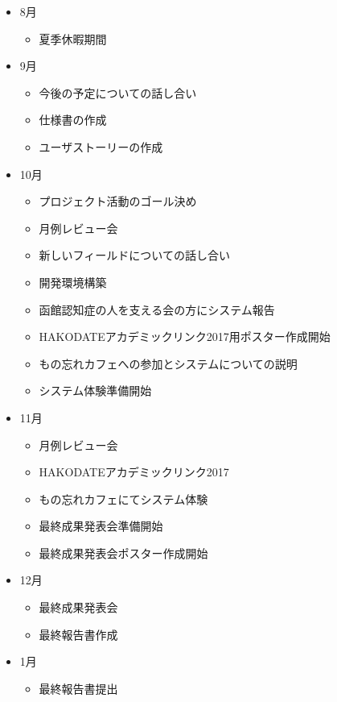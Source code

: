 \documentclass[../report]{subfiles}
\begin{document}
\begin{itemize}
\begin{itemize}
    \end{itemize}
  \item[] 8月
    \begin{itemize}
      \item 夏季休暇期間
    \end{itemize}
  \item[] 9月
    \begin{itemize}
      \item 今後の予定についての話し合い
      \item 仕様書の作成
      \item ユーザストーリーの作成
    \end{itemize}
  \item[] 10月
    \begin{itemize}
      \item プロジェクト活動のゴール決め
      \item 月例レビュー会
      \item 新しいフィールドについての話し合い
      \item 開発環境構築
      \item 函館認知症の人を支える会の方にシステム報告
      \item HAKODATEアカデミックリンク2017用ポスター作成開始
      \item もの忘れカフェへの参加とシステムについての説明
      \item システム体験準備開始
    \end{itemize}
  \item[] 11月
    \begin{itemize}
      \item 月例レビュー会
      \item HAKODATEアカデミックリンク2017
      \item もの忘れカフェにてシステム体験
      \item 最終成果発表会準備開始
      \item 最終成果発表会ポスター作成開始
    \end{itemize}
  \item[] 12月
    \begin{itemize}
      \item 最終成果発表会
      \item 最終報告書作成
    \end{itemize}
  \item[] 1月
    \begin{itemize}
      \item 最終報告書提出
    \end{itemize}
\end{itemize}
\end{document}
